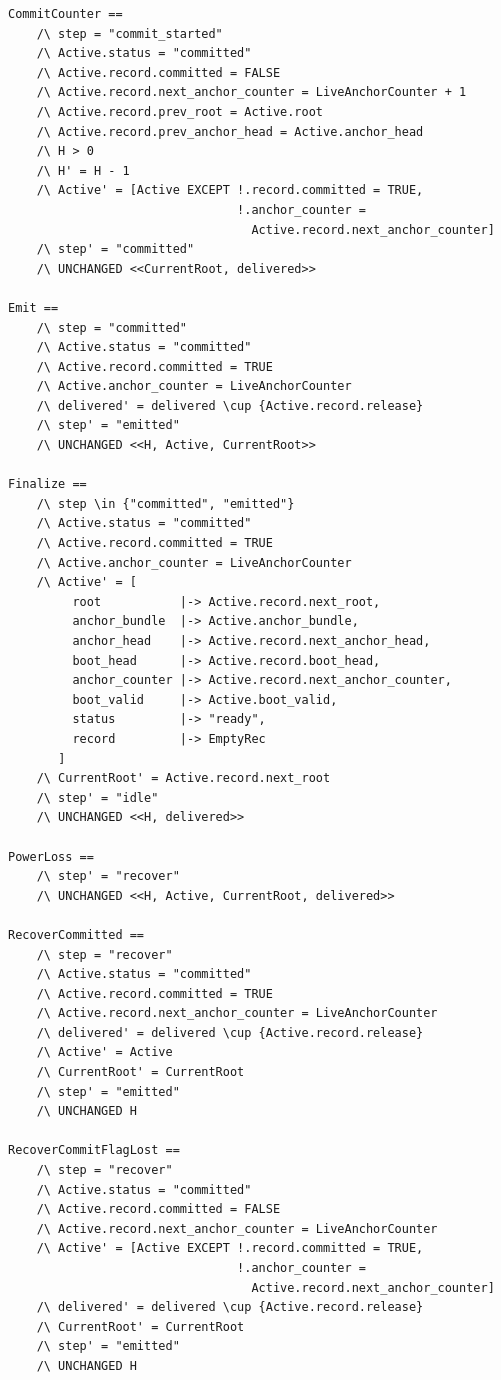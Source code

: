 \documentclass[11pt]{article}
\theoremstyle{definition}
\theoremstyle{remark}
\begin{document}
\begin{lstlisting}[language=TLA]
CommitCounter ==
    /\ step = "commit_started"
    /\ Active.status = "committed"
    /\ Active.record.committed = FALSE
    /\ Active.record.next_anchor_counter = LiveAnchorCounter + 1
    /\ Active.record.prev_root = Active.root
    /\ Active.record.prev_anchor_head = Active.anchor_head
    /\ H > 0
    /\ H' = H - 1
    /\ Active' = [Active EXCEPT !.record.committed = TRUE,
                                !.anchor_counter =
                                  Active.record.next_anchor_counter]
    /\ step' = "committed"
    /\ UNCHANGED <<CurrentRoot, delivered>>

Emit ==
    /\ step = "committed"
    /\ Active.status = "committed"
    /\ Active.record.committed = TRUE
    /\ Active.anchor_counter = LiveAnchorCounter
    /\ delivered' = delivered \cup {Active.record.release}
    /\ step' = "emitted"
    /\ UNCHANGED <<H, Active, CurrentRoot>>

Finalize ==
    /\ step \in {"committed", "emitted"}
    /\ Active.status = "committed"
    /\ Active.record.committed = TRUE
    /\ Active.anchor_counter = LiveAnchorCounter
    /\ Active' = [
         root           |-> Active.record.next_root,
         anchor_bundle  |-> Active.anchor_bundle,
         anchor_head    |-> Active.record.next_anchor_head,
         boot_head      |-> Active.record.boot_head,
         anchor_counter |-> Active.record.next_anchor_counter,
         boot_valid     |-> Active.boot_valid,
         status         |-> "ready",
         record         |-> EmptyRec
       ]
    /\ CurrentRoot' = Active.record.next_root
    /\ step' = "idle"
    /\ UNCHANGED <<H, delivered>>

PowerLoss ==
    /\ step' = "recover"
    /\ UNCHANGED <<H, Active, CurrentRoot, delivered>>

RecoverCommitted ==
    /\ step = "recover"
    /\ Active.status = "committed"
    /\ Active.record.committed = TRUE
    /\ Active.record.next_anchor_counter = LiveAnchorCounter
    /\ delivered' = delivered \cup {Active.record.release}
    /\ Active' = Active
    /\ CurrentRoot' = CurrentRoot
    /\ step' = "emitted"
    /\ UNCHANGED H

RecoverCommitFlagLost ==
    /\ step = "recover"
    /\ Active.status = "committed"
    /\ Active.record.committed = FALSE
    /\ Active.record.next_anchor_counter = LiveAnchorCounter
    /\ Active' = [Active EXCEPT !.record.committed = TRUE,
                                !.anchor_counter =
                                  Active.record.next_anchor_counter]
    /\ delivered' = delivered \cup {Active.record.release}
    /\ CurrentRoot' = CurrentRoot
    /\ step' = "emitted"
    /\ UNCHANGED H


\end{lstlisting}
\end{document}
